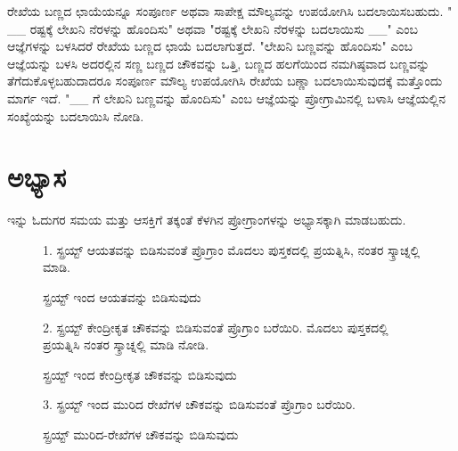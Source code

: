 ರೇಖೆಯ ಬಣ್ಣದ ಛಾಯೆಯನ್ನೂ ಸಂಪೂರ್ಣ ಅಥವಾ ಸಾಪೇಕ್ಷ ಮೌಲ್ಯವನ್ನು ಉಪಯೋಗಿಸಿ ಬದಲಾಯಿಸಬಹುದು.  " \_\_ ರಷ್ಟಕ್ಕೆ ಲೇಖನಿ ನೆರಳನ್ನು ಹೊಂದಿಸು" ಅಥವಾ "ರಷ್ಟಕ್ಕೆ ಲೇಖನಿ ನೆರಳನ್ನು ಬದಲಾಯಿಸು \_\_" ಎಂಬ ಆಜ್ಞೆಗಳನ್ನು ಬಳಸಿದರೆ ರೇಖೆಯ ಬಣ್ಣದ ಛಾಯೆ ಬದಲಾಗುತ್ತದೆ.  "ಲೇಖನಿ ಬಣ್ಣವನ್ನು ಹೊಂದಿಸು" ಎಂಬ ಆಜ್ಞೆಯನ್ನು ಬಳಸಿ ಅದರಲ್ಲಿನ ಸಣ್ಣ ಬಣ್ಣದ ಚೌಕವನ್ನು ಒತ್ತಿ, ಬಣ್ಣದ ಹಲಗೆಯಿಂದ ನಮಗಿಷ್ಠವಾದ ಬಣ್ಣವನ್ನು ತೆಗೆದುಕೊಳ್ಳಬಹುದಾದರೂ ಸಂಪೂರ್ಣ ಮೌಲ್ಯ ಉಪಯೋಗಿಸಿ ರೇಖೆಯ ಬಣ್ಣಾ ಬದಲಾಯಿಸುವುದಕ್ಕೆ ಮತ್ತೊಂದು ಮಾರ್ಗ ಇದೆ.  "\_\_ ಗೆ ಲೇಖನಿ ಬಣ್ಣವನ್ನು ಹೊಂದಿಸು" ಎಂಬ ಆಜ್ಞೆಯನ್ನು ಪ್ರೋಗ್ರಾಮಿನಲ್ಲಿ ಬಳಾಸಿ ಆಜ್ಞೆಯಲ್ಲಿನ ಸಂಖ್ಯೆಯನ್ನು ಬದಲಾಯಿಸಿ ನೋಡಿ. 

\section{ಅಭ್ಯಾಸ }
ಇನ್ನು ಓದುಗರ ಸಮಯ ಮತ್ತು ಆಸಕ್ತಿಗೆ ತಕ್ಕಂತೆ ಕೆಳಗಿನ ಪ್ರೋಗ್ರಾಂಗಳನ್ನು ಅಭ್ಯಾಸಕ್ಕಾಗಿ ಮಾಡಬಹುದು.

\begin{figure}[h]
1. ಸ್ಪ್ರಯ್ಟ್ ಆಯತವನ್ನು ಬಿಡಿಸುವಂತೆ ಪ್ರೊಗ್ರಾಂ ಮೊದಲು ಪುಸ್ತಕದಲ್ಲಿ ಪ್ರಯತ್ನಿಸಿ, ನಂತರ ಸ್ಕ್ರಾಚ್ನಲ್ಲಿ ಮಾಡಿ. 
\begin{center}
\end{center}
\caption{ಸ್ಪ್ರಯ್ಟ್ ಇಂದ  ಆಯತವನ್ನು ಬಿಡಿಸುವುದು}
\label{pen_program1}
\end{figure}

\begin{figure}[h]
2. ಸ್ಪ್ರಯ್ಟ್ ಕೇಂದ್ರೀಕೃತ ಚೌಕವನ್ನು ಬಿಡಿಸುವಂತೆ ಪ್ರೊಗ್ರಾಂ ಬರೆಯಿರಿ. ಮೊದಲು ಪುಸ್ತಕದಲ್ಲಿ ಪ್ರಯತ್ನಿಸಿ ನಂತರ ಸ್ಕ್ರಾಚ್ನಲ್ಲಿ ಮಾಡಿ ನೋಡಿ. 
\begin{center}
\end{center}
\caption{ಸ್ಪ್ರಯ್ಟ್ ಇಂದ ಕೇಂದ್ರೀಕೃತ ಚೌಕವನ್ನು ಬಿಡಿಸುವುದು}
\label{pen_program2}
\end{figure}


\begin{figure}[h]
3. ಸ್ಪ್ರಯ್ಟ್ ಇಂದ ಮುರಿದ ರೇಖೆಗಳ ಚೌಕವನ್ನು ಬಿಡಿಸುವಂತೆ ಪ್ರೊಗ್ರಾಂ ಬರೆಯಿರಿ. \begin{center}
\end{center}
\caption{ಸ್ಪ್ರಯ್ಟ್ ಮುರಿದ-ರೇಖೆಗಳ ಚೌಕವನ್ನು ಬಿಡಿಸುವುದು}
\label{pen_program3}
\end{figure}

